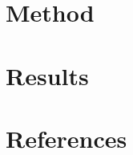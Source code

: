 \documentclass[14pt]{extarticle}
\begin{document}
%

{}
\tableofcontents

\newpage
{}
%
\setcounter{page}{1}

%

\newpage


\newpage



\newpage
\section*{Method}


\newpage
\section*{Results}

\newpage

\newpage

\newpage


%

\newpage
\section{References}
\printbibliography[heading=none]
%
\end{document}
